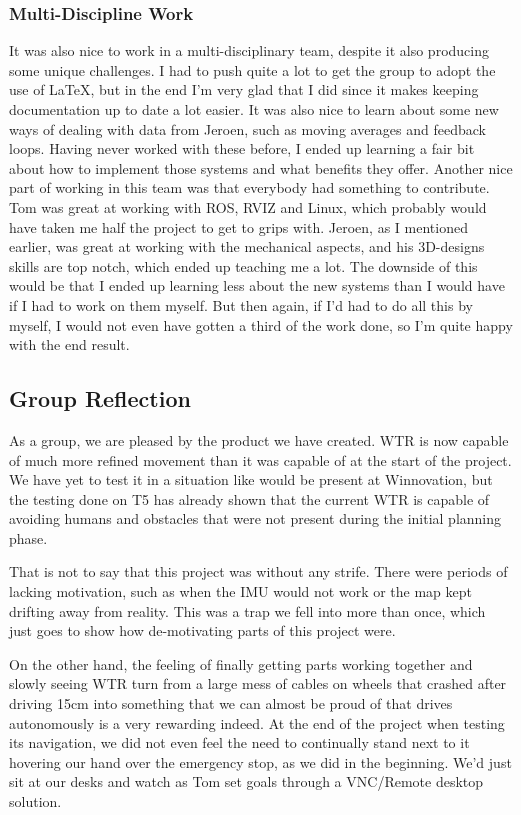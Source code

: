 \subsubsection{Multi-Discipline Work}
It was also nice to work in a multi-disciplinary team, despite it also producing some unique challenges.
I had to push quite a lot to get the group to adopt the use of \LaTeX, but in the end I'm very glad that I did since it makes keeping documentation up to date a lot easier.
It was also nice to learn about some new ways of dealing with data from Jeroen, such as moving averages and feedback loops.
Having never worked with these before, I ended up learning a fair bit about how to implement those systems and what benefits they offer.
Another nice part of working in this team was that everybody had something to contribute.
Tom was great at working with ROS, RVIZ and Linux, which probably would have taken me half the project to get to grips with.
Jeroen, as I mentioned earlier, was great at working with the mechanical aspects, and his 3D-designs skills are top notch, which ended up teaching me a lot.
The downside of this would be that I ended up learning less about the new systems than I would have if I had to work on them myself.
But then again, if I'd had to do all this by myself, I would not even have gotten a third of the work done, so I'm quite happy with the end result.

\newpage

\subsection{Group Reflection}
As a group, we are pleased by the product we have created.
WTR is now capable of much more refined movement than it was capable of at the start of the project.
We have yet to test it in a situation like would be present at Winnovation, but the testing done on T5 has already shown that the current WTR is capable of avoiding humans and obstacles that were not present during the initial planning phase.

That is not to say that this project was without any strife.
There were periods of lacking motivation, such as when the IMU would not work or the map kept drifting away from reality.
This was a trap we fell into more than once, which just goes to show how de-motivating parts of this project were.

On the other hand, the feeling of finally getting parts working together and slowly seeing WTR turn from a large mess of cables on wheels that crashed after driving 15cm into something that we can almost be proud of that drives autonomously is a very rewarding indeed.
At the end of the project when testing its navigation, we did not even feel the need to continually stand next to it hovering our hand over the emergency stop, as we did in the beginning.
We'd just sit at our desks and watch as Tom set goals through a VNC/Remote desktop solution.

